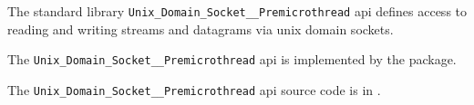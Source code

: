 
The standard library {\tt Unix\_Domain\_Socket\_\_Premicrothread} api defines access to reading and writing 
streams and datagrams via unix domain sockets.

The {\tt Unix\_Domain\_Socket\_\_Premicrothread} api is implemented by the  package.

The {\tt Unix\_Domain\_Socket\_\_Premicrothread} api source code is in .

